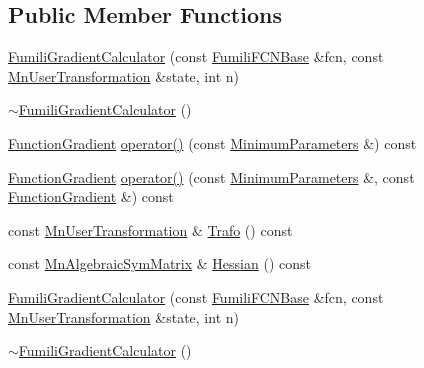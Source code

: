 \subsection*{Public Member Functions}
\begin{DoxyCompactItemize}
\item 
\mbox{\hyperlink{classROOT_1_1Minuit2_1_1FumiliGradientCalculator_a16d3be3cdef72a0d3cee0bbc683757fc}{Fumili\+Gradient\+Calculator}} (const \mbox{\hyperlink{classROOT_1_1Minuit2_1_1FumiliFCNBase}{Fumili\+F\+C\+N\+Base}} \&fcn, const \mbox{\hyperlink{classROOT_1_1Minuit2_1_1MnUserTransformation}{Mn\+User\+Transformation}} \&state, int n)
\item 
\mbox{\hyperlink{classROOT_1_1Minuit2_1_1FumiliGradientCalculator_ad976f280f136a5bffb2a317da3f94136}{$\sim$\+Fumili\+Gradient\+Calculator}} ()
\item 
\mbox{\hyperlink{classROOT_1_1Minuit2_1_1FunctionGradient}{Function\+Gradient}} \mbox{\hyperlink{classROOT_1_1Minuit2_1_1FumiliGradientCalculator_a23fd61bceabbf88e66c5abe6b2815331}{operator()}} (const \mbox{\hyperlink{classROOT_1_1Minuit2_1_1MinimumParameters}{Minimum\+Parameters}} \&) const
\item 
\mbox{\hyperlink{classROOT_1_1Minuit2_1_1FunctionGradient}{Function\+Gradient}} \mbox{\hyperlink{classROOT_1_1Minuit2_1_1FumiliGradientCalculator_a652f65091b404ebda9a645d7ba92b3b6}{operator()}} (const \mbox{\hyperlink{classROOT_1_1Minuit2_1_1MinimumParameters}{Minimum\+Parameters}} \&, const \mbox{\hyperlink{classROOT_1_1Minuit2_1_1FunctionGradient}{Function\+Gradient}} \&) const
\item 
const \mbox{\hyperlink{classROOT_1_1Minuit2_1_1MnUserTransformation}{Mn\+User\+Transformation}} \& \mbox{\hyperlink{classROOT_1_1Minuit2_1_1FumiliGradientCalculator_a60672fa936f927ab01a7eb9ede6cb6e0}{Trafo}} () const
\item 
const \mbox{\hyperlink{namespaceROOT_1_1Minuit2_a9e74ad97f5537a2e80e52b04d98ecc6e}{Mn\+Algebraic\+Sym\+Matrix}} \& \mbox{\hyperlink{classROOT_1_1Minuit2_1_1FumiliGradientCalculator_aa6c751b836a8ce27b7335d7d3d6a653f}{Hessian}} () const
\item 
\mbox{\hyperlink{classROOT_1_1Minuit2_1_1FumiliGradientCalculator_a16d3be3cdef72a0d3cee0bbc683757fc}{Fumili\+Gradient\+Calculator}} (const \mbox{\hyperlink{classROOT_1_1Minuit2_1_1FumiliFCNBase}{Fumili\+F\+C\+N\+Base}} \&fcn, const \mbox{\hyperlink{classROOT_1_1Minuit2_1_1MnUserTransformation}{Mn\+User\+Transformation}} \&state, int n)
\item 
\mbox{\hyperlink{classROOT_1_1Minuit2_1_1FumiliGradientCalculator_ad976f280f136a5bffb2a317da3f94136}{$\sim$\+Fumili\+Gradient\+Calculator}} ()

\end{DoxyCompactItemize}

